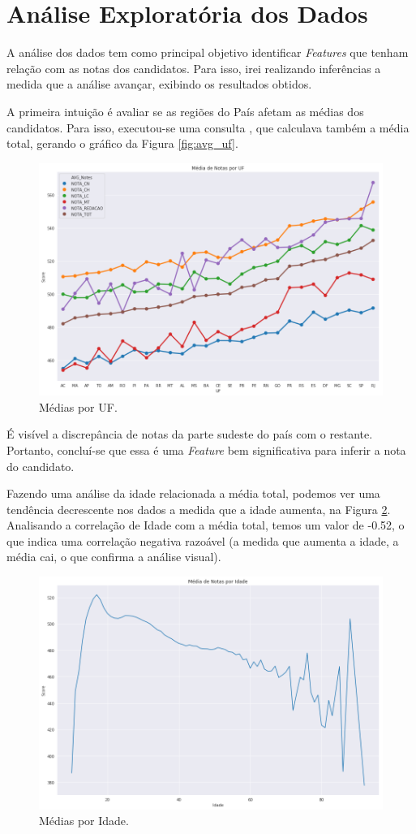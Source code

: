 \documentclass{article}
\begin{document}
\newpage
\section{Análise Exploratória dos Dados}

A análise dos dados tem como principal objetivo identificar \emph{Features} que tenham relação com as notas dos candidatos. Para isso, irei realizando inferências a medida que a análise avançar, exibindo os resultados obtidos.

A primeira intuição é avaliar se as regiões do País afetam as médias dos candidatos. Para isso, executou-se uma consulta , que calculava também a média total, gerando o gráfico da Figura \ref{fig:avg_uf}.

\begin{figure}[H]
\centering
  \includegraphics[width= 0.8 \linewidth]{img/mean_by_uf.png}
  \caption{Médias por UF.}
  \label{fig:fig_maq_criad}
\end{figure}

É visível a discrepância de notas da parte sudeste do país com o restante. Portanto, concluí-se que essa é uma \emph{Feature} bem significativa para inferir a nota do candidato.

Fazendo uma análise da idade relacionada a média total, podemos ver uma tendência decrescente nos dados a medida que a idade aumenta, na Figura \ref{fig:mean_by_age}. Analisando a correlação de Idade com a média total, temos um valor de -0.52, o que indica uma correlação negativa razoável (a medida que aumenta a idade, a média cai, o que confirma a análise visual).

\begin{figure}[H]
\centering
  \includegraphics[width=0.8 \linewidth]{img/mean_by_age.png}
  \caption{Médias por Idade.}
  \label{fig:mean_by_age}
\end{figure}
\end{document}
